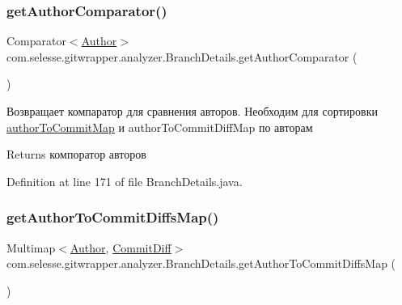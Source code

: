 \subsubsection{\texorpdfstring{get\+Author\+Comparator()}{getAuthorComparator()}}
{\footnotesize\ttfamily Comparator$<$\hyperlink{classcom_1_1selesse_1_1gitwrapper_1_1myobjects_1_1_author}{Author}$>$ com.\+selesse.\+gitwrapper.\+analyzer.\+Branch\+Details.\+get\+Author\+Comparator (\begin{DoxyParamCaption}{ }\end{DoxyParamCaption})\hspace{0.3cm}{\ttfamily [private]}}

Возвращает компаратор для сравнения авторов. Необходим для сортировки \hyperlink{classcom_1_1selesse_1_1gitwrapper_1_1analyzer_1_1_branch_details_a7d1d082fec3eff2baa1f51b0682a5088}{author\+To\+Commit\+Map} и author\+To\+Commit\+Diff\+Map по авторам

\begin{DoxyReturn}{Returns}
компоратор авторов 
\end{DoxyReturn}


Definition at line 171 of file Branch\+Details.\+java.

\mbox{\label{classcom_1_1selesse_1_1gitwrapper_1_1analyzer_1_1_branch_details_a49f4e18287dce2956a9c1cad2cbc0a2b}} 
\subsubsection{\texorpdfstring{get\+Author\+To\+Commit\+Diffs\+Map()}{getAuthorToCommitDiffsMap()}}
{\footnotesize\ttfamily Multimap$<$\hyperlink{classcom_1_1selesse_1_1gitwrapper_1_1myobjects_1_1_author}{Author}, \hyperlink{classcom_1_1selesse_1_1gitwrapper_1_1myobjects_1_1_commit_diff}{Commit\+Diff}$>$ com.\+selesse.\+gitwrapper.\+analyzer.\+Branch\+Details.\+get\+Author\+To\+Commit\+Diffs\+Map (\begin{DoxyParamCaption}{ }\end{DoxyParamCaption})}


